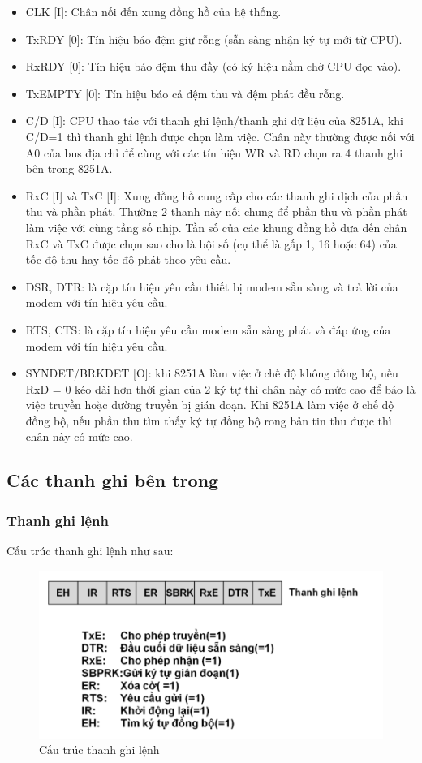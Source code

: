 \documentclass[../report.tex]{subfiles}
\begin{document}
\begin{itemize}
    \item  CLK [I]: Chân nối đến xung đồng hồ của hệ thống.
    \item  TxRDY [0]: Tín hiệu báo đệm giữ rỗng (sẵn sàng nhận ký tự mới từ CPU).
    \item  RxRDY [0]: Tín hiệu báo đệm thu đầy (có ký hiệu nằm chờ CPU đọc vào).
    \item TxEMPTY [0]: Tín hiệu báo cả đệm thu và đệm phát đều rỗng. 
    \item C/D [I]: CPU thao tác với thanh ghi lệnh/thanh ghi dữ liệu của 8251A, khi C/D=1 thì
thanh ghi lệnh được chọn làm việc. Chân này thường được nối với A0 của bus địa chỉ để cùng
với các tín hiệu WR và RD chọn ra 4 thanh ghi bên trong 8251A. 
    \item  RxC [I] và TxC [I]: Xung đồng hồ cung cấp cho các thanh ghi dịch của phần thu và
phần phát. Thường 2 thanh này nối chung để phần thu và phần phát làm việc với cùng tầng số
nhịp. Tần số của các khung đồng hồ đưa đến chân RxC và TxC được chọn sao cho là bội số
(cụ thể là gấp 1, 16 hoặc 64) của tốc độ thu hay tốc độ phát theo yêu cầu. 
    \item DSR, DTR: là cặp tín hiệu yêu cầu thiết bị modem sẵn sàng và trả lời của modem với tín hiệu yêu cầu. 
    \item RTS, CTS:  là cặp tín hiệu yêu cầu modem sẵn sàng phát và đáp ứng của modem với tín hiệu yêu cầu. 
    \item SYNDET/BRKDET [O]: khi 8251A làm việc ở chế độ không đồng bộ, nếu RxD = 0
kéo dài hơn thời gian của 2 ký tự thì chân này có mức cao để báo là việc truyền hoặc đường
truyền bị gián đoạn. Khi 8251A làm việc ở chế độ đồng bộ, nếu phần thu tìm thấy ký tự đồng
bộ rong bản tin thu được thì chân này có mức cao.
\end{itemize}

\subsection{Các thanh ghi bên trong}
\subsubsection{Thanh ghi lệnh}
Cấu trúc thanh ghi lệnh như sau:
\begin{figure}[H]
    \centering
    \includegraphics[width=\textwidth]{figures/lenh.png}
    \caption{Cấu trúc thanh ghi lệnh}
\end{figure}
\end{document}
